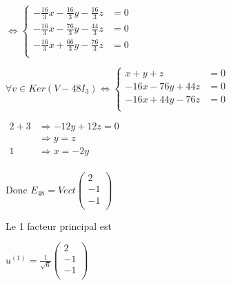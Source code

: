 \documentclass[a4paper, 12pt]{article}
\begin{document}
\begin{center}
$
\Leftrightarrow
\left \{
\begin{aligned}
- \frac{16}{3}x - \frac{16}{3}y - \frac{16}{3}z &= 0 \\
- \frac{16}{3}x - \frac{76}{3}y - \frac{44}{3}z &= 0 \\
- \frac{16}{3}x + \frac{66}{3}y - \frac{76}{3}z &= 0 \\
\end{aligned}
\right .
$
\end{center}

\begin{center}
$
\forall v \in Ker(V - 48I_3) \Leftrightarrow
\left \{
\begin{aligned}
x + y + z &= 0 \\
-16x - 76y + 44z &= 0 \\
-16x + 44y - 76z &= 0 \\
\end{aligned}
\right .
$
\end{center}

\begin{center}
$
\begin{aligned}
2 + 3 & \Rightarrow -12y + 12z = 0 \\
& \Rightarrow \boxed{y = z} \\
1 & \Rightarrow \boxed{x = -2y} \\
\end{aligned}
$ \\
\end{center}

\begin{flushleft}
Donc $E_{48} = Vect
\begin{pmatrix}
2 \\
-1 \\
-1 \\
\end{pmatrix}
$
\end{flushleft}

\begin{flushleft}
Le 1 facteur principal est
\end{flushleft}
\begin{center}
$
u^{(1)} = \frac{1}{\sqrt{6}}
\begin{pmatrix}
2 \\
-1 \\
-1 \\
\end{pmatrix}
$
\end{center}
\end{document}
